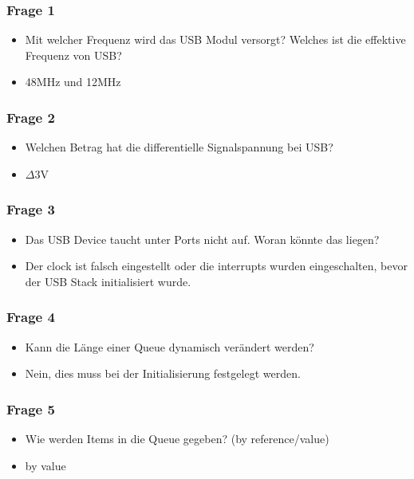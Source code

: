 \documentclass{beamer}
\begin{document}
	\begin{frame}
		\frametitle{Frage 1}
		\begin{itemize}
			\item<1-> Mit welcher Frequenz wird das USB Modul versorgt? Welches ist die effektive Frequenz von USB?
			\item<2-> 48MHz und 12MHz
		\end{itemize}
	\end{frame}
	\begin{frame}
		\frametitle{Frage 2}
		\begin{itemize}
			\item<1-> Welchen Betrag hat die differentielle Signalspannung bei USB?
			\item<2-> $\Delta$3V	
		\end{itemize}
	\end{frame}
	\begin{frame}
		\frametitle{Frage 3}
		\begin{itemize}
			\item<1-> Das USB Device taucht unter Ports nicht auf. Woran könnte das liegen?
			\item<2-> Der clock ist falsch eingestellt oder die interrupts wurden eingeschalten, bevor der USB Stack initialisiert wurde.
		\end{itemize}
	\end{frame}
	\begin{frame}
		\frametitle{Frage 4}
		\begin{itemize}
			\item<1-> Kann die Länge einer Queue dynamisch verändert werden?
 			\item<2-> Nein, dies muss bei der Initialisierung festgelegt werden.
		\end{itemize}
	\end{frame}
	\begin{frame}
		\frametitle{Frage 5}
		\begin{itemize}
			\item<1-> Wie werden Items in die Queue gegeben? (by reference/value)
			\item<2-> by value
		\end{itemize}
	\end{frame}
\end{document}
